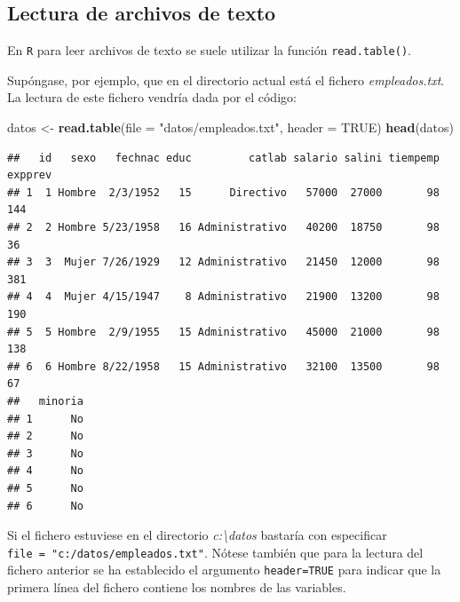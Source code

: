 \documentclass[]{book}
\newenvironment{Shaded}{\begin{snugshade}}{\end{snugshade}}
\newcommand{\KeywordTok}[1]{\textcolor[rgb]{0.13,0.29,0.53}{\textbf{#1}}}
\newcommand{\DataTypeTok}[1]{\textcolor[rgb]{0.13,0.29,0.53}{#1}}
\newcommand{\StringTok}[1]{\textcolor[rgb]{0.31,0.60,0.02}{#1}}
\newcommand{\CommentTok}[1]{\textcolor[rgb]{0.56,0.35,0.01}{\textit{#1}}}
\newcommand{\OtherTok}[1]{\textcolor[rgb]{0.56,0.35,0.01}{#1}}
\newcommand{\OperatorTok}[1]{\textcolor[rgb]{0.81,0.36,0.00}{\textbf{#1}}}
\newcommand{\NormalTok}[1]{#1}
\begin{document}
\begin{Shaded}
\end{Shaded}

\subsection{Lectura de archivos de
texto}\label{lectura-de-archivos-de-texto}

En \texttt{R} para leer archivos de texto se suele utilizar la función
\texttt{read.table()}.

Supóngase, por ejemplo, que en el directorio actual está el fichero
\emph{empleados.txt}. La lectura de este fichero vendría dada por el
código:

\begin{Shaded}
\begin{Highlighting}[]
\NormalTok{datos <-}\StringTok{ }\KeywordTok{read.table}\NormalTok{(}\DataTypeTok{file =} \StringTok{"datos/empleados.txt"}\NormalTok{, }\DataTypeTok{header =} \OtherTok{TRUE}\NormalTok{)}
\KeywordTok{head}\NormalTok{(datos)}
\end{Highlighting}
\end{Shaded}

\begin{verbatim}
##   id   sexo   fechnac educ         catlab salario salini tiempemp expprev
## 1  1 Hombre  2/3/1952   15      Directivo   57000  27000       98     144
## 2  2 Hombre 5/23/1958   16 Administrativo   40200  18750       98      36
## 3  3  Mujer 7/26/1929   12 Administrativo   21450  12000       98     381
## 4  4  Mujer 4/15/1947    8 Administrativo   21900  13200       98     190
## 5  5 Hombre  2/9/1955   15 Administrativo   45000  21000       98     138
## 6  6 Hombre 8/22/1958   15 Administrativo   32100  13500       98      67
##   minoria
## 1      No
## 2      No
## 3      No
## 4      No
## 5      No
## 6      No
\end{verbatim}

Si el fichero estuviese en el directorio \emph{c:\textbackslash{}datos}
bastaría con especificar \texttt{file\ =\ "c:/datos/empleados.txt"}.
Nótese también que para la lectura del fichero anterior se ha
establecido el argumento \texttt{header=TRUE} para indicar que la
primera línea del fichero contiene los nombres de las variables.
\end{document}
